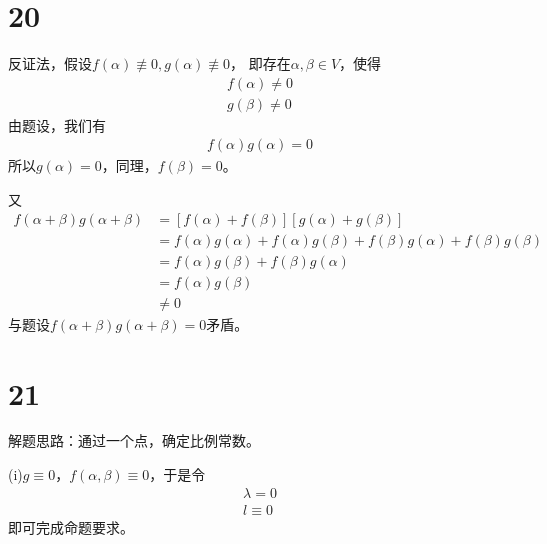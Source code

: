 \documentclass{article}
\begin{document}
\section*{20}

反证法，假设$f(\alpha) \not \equiv 0, g(\alpha) \not \equiv 0$，
即存在$\alpha, \beta \in V$，使得
\begin{align*}
  f(\alpha) \neq 0 \\
  g(\beta) \neq 0
\end{align*}
由题设，我们有
\begin{align*}
  f(\alpha ) g(\alpha) = 0
\end{align*}
所以$g(\alpha) = 0$，同理，$f(\beta) = 0$。

又
\begin{align*}
  f(\alpha + \beta) g(\alpha + \beta)
   & = [f(\alpha) + f(\beta)][g(\alpha) + g(\beta)]                                      \\
   & = f(\alpha) g(\alpha) + f(\alpha) g(\beta) + f(\beta) g(\alpha) + f(\beta) g(\beta) \\
   & = f(\alpha) g(\beta) + f(\beta) g(\alpha)                                           \\
   & = f(\alpha) g(\beta)                                                                \\
   & \neq 0
\end{align*}
与题设$f(\alpha + \beta) g(\alpha + \beta) = 0$矛盾。

\section*{21}

解题思路：通过一个点，确定比例常数。

(i)$g \equiv 0$，$f(\alpha, \beta) \equiv 0$，于是令
\begin{align*}
  \lambda = 0 \\
  l \equiv 0
\end{align*}
即可完成命题要求。
\end{document}
